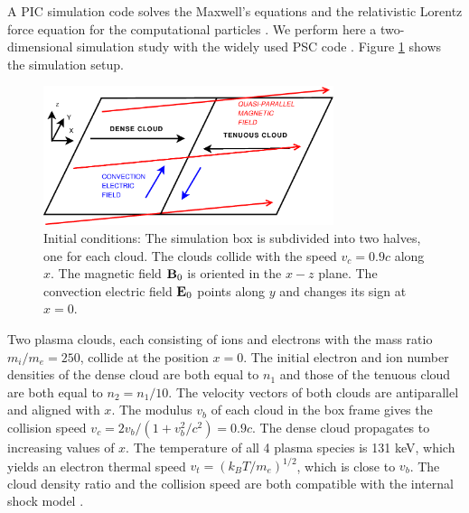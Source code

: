 \documentclass[twocolumn,showpacs,preprintnumbers,amsmath,amssymb]{revtex4}
\begin{document}
A PIC simulation code solves the Maxwell's equations and the relativistic Lorentz force equation 
for the computational particles \cite{Dawson}. We perform here a two-dimensional simulation study
with the widely used PSC code \cite{PSC}. Figure \ref{fig1} shows the simulation setup. 
\begin{figure}
\includegraphics[width=8.5cm]{Fig1.eps}
\caption{Initial conditions: The simulation box is subdivided into two halves, one for each cloud. 
The clouds collide with the speed $v_c = 0.9c$ along $x$. The magnetic field ${\bf B}_0$ is oriented 
in the $x-z$ plane. The convection electric field ${\bf E}_0$ points along $y$ and changes its sign
at $x=0$.\label{fig1}}
\end{figure}
Two plasma clouds, each consisting of ions and electrons with the mass ratio $m_i / m_e = 250$, 
collide at the position $x=0$. The initial electron and ion number densities of the dense cloud 
are both equal to $n_1$ and those of the tenuous cloud are both equal to $n_2 = n_1 / 10$. The 
velocity vectors of both clouds are antiparallel and aligned with $x$. The modulus $v_b$ of each 
cloud in the box frame gives the collision speed $v_c = 2v_b / (1+v_b^2/c^2) = 0.9c$. The dense 
cloud propagates to increasing values of $x$. The temperature of all 4 plasma species is 131 keV,
which yields an electron thermal speed $v_t = {(k_B T/m_e)}^{1/2}$, which is close to $v_b$. The 
cloud density ratio and the collision speed are both compatible with the internal shock model 
\cite{Piran}. 
\end{document}
